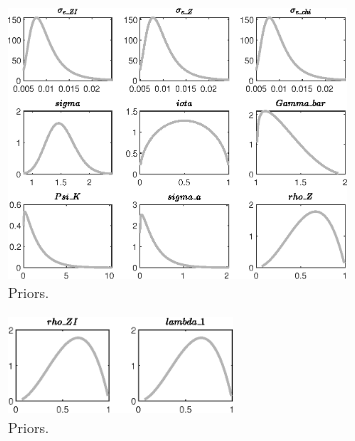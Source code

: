  
\begin{figure}[H]
\centering
\includegraphics[width=0.80\textwidth]{two_sector_RBC_fixed_cost/graphs/two_sector_RBC_fixed_cost_Priors1}
\caption{Priors.}\label{Fig:Priors:1}
\end{figure}
\begin{figure}[H]
\centering
\includegraphics[width=0.53\textwidth]{two_sector_RBC_fixed_cost/graphs/two_sector_RBC_fixed_cost_Priors2}
\caption{Priors.}\label{Fig:Priors:2}
\end{figure}
 
